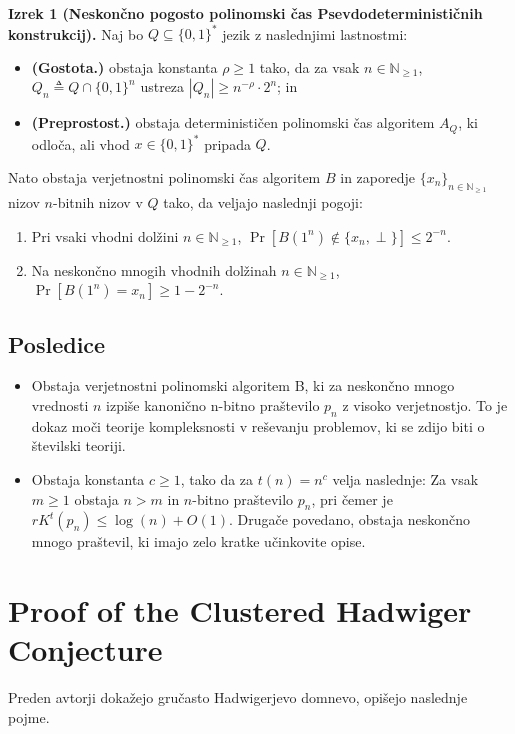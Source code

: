 \documentclass{article}
\begin{document}
\textbf{Izrek 1 (Neskončno pogosto polinomski čas Psevdodeterminističnih konstrukcij).} Naj bo \( Q \subseteq \{0, 1\}^* \) jezik z naslednjimi lastnostmi:
\begin{itemize}
    \item \textbf{(Gostota.)} obstaja konstanta \( \rho \geq 1 \) tako, da za vsak \( n \in \mathbb{N}_{\geq 1} \), \( Q_n \triangleq Q \cap \{0, 1\}^n \) ustreza \( |Q_n| \geq n^{-\rho} \cdot 2^n \); in
    \item \textbf{(Preprostost.)} obstaja determinističen polinomski čas algoritem \( A_Q \), ki odloča, ali vhod \( x \in \{0, 1\}^* \) pripada \( Q \).
\end{itemize}
Nato obstaja verjetnostni polinomski čas algoritem \( B \) in zaporedje \( \{x_n\}_{n \in \mathbb{N}_{\geq 1}} \) nizov \( n \)-bitnih nizov v \( Q \) tako, da veljajo naslednji pogoji:
\begin{enumerate}
    \item Pri vsaki vhodni dolžini \( n \in \mathbb{N}_{\geq 1} \), \( \Pr[B(1^n) \notin \{x_n, \perp\}] \leq 2^{-n} \).
    \item Na neskončno mnogih vhodnih dolžinah \( n \in \mathbb{N}_{\geq 1} \), \( \Pr[B(1^n) = x_n] \geq 1 - 2^{-n} \).
\end{enumerate}


\subsection*{Posledice}
\begin{itemize}
    \item Obstaja verjetnostni polinomski algoritem B, ki za neskončno mnogo vrednosti $n$ izpiše kanonično n-bitno praštevilo $p_n$ z visoko verjetnostjo. To je dokaz moči teorije kompleksnosti v reševanju problemov, ki se zdijo biti o številski teoriji.
    \item Obstaja konstanta $c \geq 1$, tako da za $t(n) = n^c$ velja naslednje: Za vsak $m \geq 1$ obstaja $n > m$ in $n$-bitno praštevilo $p_n$, pri čemer je $rK^{t}(p_n) \leq \log(n) + O(1)$. Drugače povedano, obstaja neskončno mnogo praštevil, ki imajo zelo kratke učinkovite opise.
\end{itemize}
\section{Proof of the Clustered Hadwiger Conjecture}
Preden avtorji dokažejo gručasto Hadwigerjevo domnevo, opišejo naslednje pojme.\\
\end{document}
